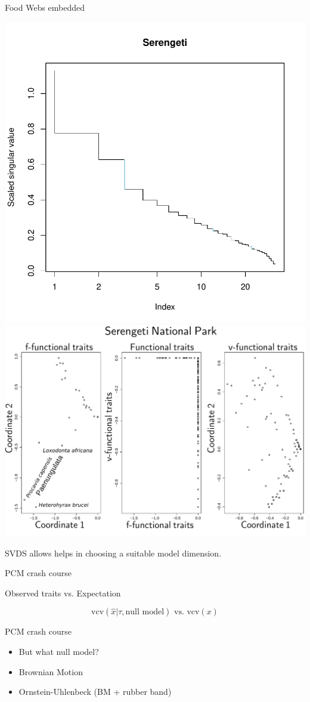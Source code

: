 \documentclass[]{beamer}
\begin{document}
\begin{frame}{Food Webs embedded}

\centering
  \includegraphics[width=0.4\linewidth]{images/Serengeti_svds.pdf}
  \includegraphics[width=0.6\linewidth]{images/Serengeti_Traits.pdf}

\centering
{\tiny SVDS allows helps in choosing a suitable model dimension.}
 
\end{frame}

\begin{frame}{PCM crash course}

\centering
Observed traits vs. Expectation

  \begin{equation*}
    \textrm{vcv}\left( \hat{x} | \tau, \mbox{null model} \right) \mbox{ vs. } \textrm{vcv}\left(x\right)
  \end{equation*}

\end{frame}

\begin{frame}{PCM crash course}

\centering

\begin{itemize}[<+->]
\itemsep1pt\parskip0pt
\item
But what null model?
\item
Brownian Motion
\item
Ornstein-Uhlenbeck (BM + rubber band)
\end{itemize}

\end{frame}
\end{document}
